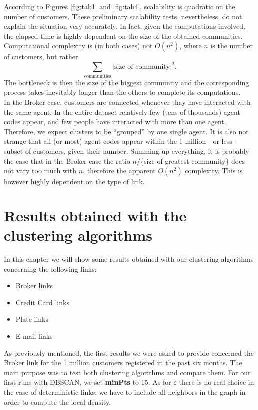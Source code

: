 \documentclass[a4paper,11pt]{book}
\begin{document}
According to Figures \ref{fig:tab1} and \ref{fig:tab4}, scalability is quadratic on the number of customers. These preliminary scalability tests, nevertheless, do not explain the situation very accurately. In fact, given the computations involved, the elapsed time is highly dependent on the size of the obtained communities. Computational complexity is (in both cases) not $O(n^2)$, where $n$ is the number of customers, but rather 
$$
\sum_{\text{communities}}|\text{size of community}|^2.
$$
The bottleneck is then the size of the biggest community and the corresponding process takes inevitably longer than the others to complete its computations.\\
In the Broker case, customers are connected whenever thay have interacted with the same agent. In the entire dataset relatively few (tens of thousands) agent codes appear, and few people have interacted with more than one agent. Therefore, we expect clusters to be ``grouped'' by one single agent. It is also not strange that all (or most) agent codes appear within the 1-million - or less - subset of customers, given their number. Summing up everything, it is probably the case that in the Broker case the ratio $n/$\{size of greatest community\} does not vary too much with $n$, therefore the apparent $O(n^2)$ complexity. This is however highly dependent on the type of link.
\chapter{Results obtained with the clustering algorithms}
In this chapter we will show some results obtained with our clustering algorithms concerning the following links:
\begin{itemize}
\item Broker links
\item Credit Card links
\item Plate links
\item E-mail links
\end{itemize}
As previously mentioned, the first results we were asked to provide concerned the Broker link for the 1 million customers registered in the past six months. The main purpose was to test both clustering algorithms and compare them. For our first runs with DBSCAN, we set \textbf{minPts} to 15. As for $\varepsilon$ there is no real choice in the case of deterministic links: we have to include all neighbors in the graph in order to compute the local density.\\
\end{document}
